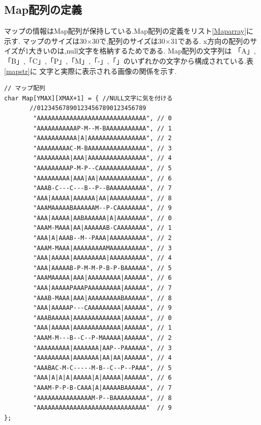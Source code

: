 \documentclass[a4j]{jarticle}
\begin{document}
    \subsection{Map配列の定義}
    マップの情報はMap配列が保持している.Map配列の定義をリスト\ref{Maparray}に示す.
    マップのサイズは30$\times$30で,配列のサイズは30$\times$31である.
    x方向の配列のサイズが1大きいのは,null文字を格納するためである. Map配列の文字列は
    「A」,「B」,「C」,「P」,「M」,「-」,「\textbar」のいずれかの文字から構成されている.表\ref{mapstr}に
    文字と実際に表示される画像の関係を示す.
    \begin{lstlisting}[basicstyle=\ttfamily\footnotesize, frame=single,label=Maparray,caption=Map配列の定義]
// マップ配列
char Map[YMAX][XMAX+1] = { //NULL文字に気を付ける
       //012345678901234567890123456789      
        "AAAAAAAAAAAAAAAAAAAAAAAAAAAAAA", // 0
        "AAAAAAAAAAAP-M--M-BAAAAAAAAAAA", // 1
        "AAAAAAAAAAA|A|AAAAAAAAAAAAAAAA", // 2
        "AAAAAAAAAC-M-BAAAAAAAAAAAAAAAA", // 3
        "AAAAAAAAA|AAA|AAAAAAAAAAAAAAAA", // 4
        "AAAAAAAAAP-M-P--CAAAAAAAAAAAAA", // 5
        "AAAAAAAAA|AAA|AA|AAAAAAAAAAAAA", // 6
        "AAAB-C---C---B--P--BAAAAAAAAAA", // 7
        "AAA|AAAAA|AAAAAA|AA|AAAAAAAAAA", // 8
        "AAAMAAAAABAAAAAAM--P-CAAAAAAAA", // 9
        "AAA|AAAAA|AABAAAAAA|A|AAAAAAAA", // 0
        "AAAM-MAAA|AA|AAAAAAB-CAAAAAAAA", // 1
        "AAA|A|AAAB--M--PAAA|AAAAAAAAAA", // 2
        "AAAM-MAAA|AAAAAAAAAMAAAAAAAAAA", // 3
        "AAA|AAAAA|AAAAAAAAA|AAAAAAAAAA", // 4
        "AAA|AAAAAB-P-M-M-P-B-P-BAAAAAA", // 5
        "AAAMAAAAA|AAA|AAAAAAAAA|AAAAAA", // 6
        "AAA|AAAAAPAAAPAAAAAAAAA|AAAAAA", // 7
        "AAAB-MAAA|AAA|AAAAAAAAABAAAAAA", // 8
        "AAA|AAAAAP---CAAAAAAAAA|AAAAAA", // 9
        "AAABAAAAA|AAAAAAAAAAAAA|AAAAAA", // 0
        "AAA|AAAAA|AAAAAAAAAAAAA|AAAAAA", // 1
        "AAAM-M---B--C--P-MAAAAA|AAAAAA", // 2
        "AAAAAAAAA|AAAAAAA|AAP--PAAAAAA", // 3
        "AAAAAAAAA|AAAAAAA|AA|AA|AAAAAA", // 4
        "AAABAC-M-C-----M-B--C--P--PAAA", // 5
        "AAA|A|A|A|AAAAA|A|AAAAA|AAAAAA", // 6
        "AAAM-P-P-B-CAAA|A|AAAAABAAAAAA", // 7
        "AAAAAAAAAAAAAAAM-P--BAAAAAAAAA", // 8
        "AAAAAAAAAAAAAAAAAAAAAAAAAAAAAA"  // 9
};
    \end{lstlisting}
\end{document}
